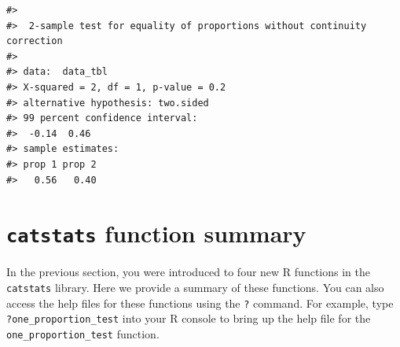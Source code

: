 \documentclass[
  10pt,
  openany]{book}
\theoremstyle{definition}
\theoremstyle{definition}
\theoremstyle{definition}
\theoremstyle{definition}
\theoremstyle{remark}
\begin{document}
\begin{verbatim}
#> 
#>  2-sample test for equality of proportions without continuity correction
#> 
#> data:  data_tbl
#> X-squared = 2, df = 1, p-value = 0.2
#> alternative hypothesis: two.sided
#> 99 percent confidence interval:
#>  -0.14  0.46
#> sample estimates:
#> prop 1 prop 2 
#>   0.56   0.40
\end{verbatim}

\section{\texorpdfstring{\texttt{catstats} function summary}{catstats function summary}}\label{catstats-function-summary}

In the previous section, you were introduced to four new R functions in the \texttt{catstats} library. Here we provide a summary of these functions. You can also access the help files for these functions using the \texttt{?} command. For example, type \texttt{?one\_proportion\_test} into your R console to bring up the help file for the \texttt{one\_proportion\_test} function.
\end{document}
